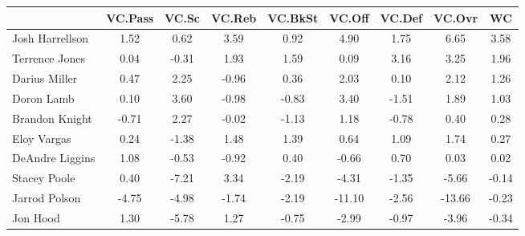 \documentclass[10pt]{article}
\begin{document}
\begin{table}[ht]
\begin{center}
\begin{tabular}{lcccccccc}
  \hline
 & VC.Pass & VC.Sc & VC.Reb & VC.BkSt & VC.Off & VC.Def & VC.Ovr & WC \\ 
  \hline
Josh Harrellson & 1.52 & 0.62 & 3.59 & 0.92 & 4.90 & 1.75 & 6.65 & 3.58 \\ 
  Terrence Jones & 0.04 & -0.31 & 1.93 & 1.59 & 0.09 & 3.16 & 3.25 & 1.96 \\ 
  Darius Miller & 0.47 & 2.25 & -0.96 & 0.36 & 2.03 & 0.10 & 2.12 & 1.26 \\ 
  Doron Lamb & 0.10 & 3.60 & -0.98 & -0.83 & 3.40 & -1.51 & 1.89 & 1.03 \\ 
  Brandon Knight & -0.71 & 2.27 & -0.02 & -1.13 & 1.18 & -0.78 & 0.40 & 0.28 \\ 
  Eloy Vargas & 0.24 & -1.38 & 1.48 & 1.39 & 0.64 & 1.09 & 1.74 & 0.27 \\ 
  DeAndre Liggins & 1.08 & -0.53 & -0.92 & 0.40 & -0.66 & 0.70 & 0.03 & 0.02 \\ 
  Stacey Poole & 0.40 & -7.21 & 3.34 & -2.19 & -4.31 & -1.35 & -5.66 & -0.14 \\ 
  Jarrod Polson & -4.75 & -4.98 & -1.74 & -2.19 & -11.10 & -2.56 & -13.66 & -0.23 \\ 
  Jon Hood & 1.30 & -5.78 & 1.27 & -0.75 & -2.99 & -0.97 & -3.96 & -0.34 \\ 
   \hline
\end{tabular}
\end{center}
\end{table}
\end{document}
